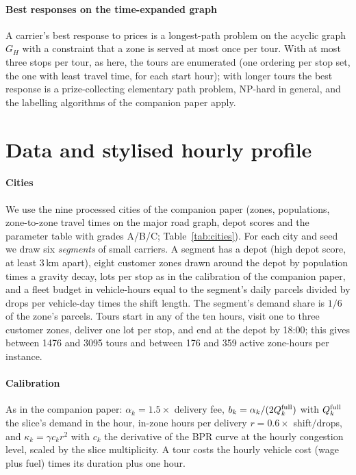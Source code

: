 \documentclass[preprint,11pt,authoryear]{elsarticle}
\theoremstyle{plain}
\theoremstyle{remark}
\begin{document}
\paragraph{Best responses on the time-expanded graph} A carrier's best response to prices is a longest-path problem on the acyclic graph $G_H$ with a constraint that a zone is served at most once per tour. With at most three stops per tour, as here, the tours are enumerated (one ordering per stop set, the one with least travel time, for each start hour); with longer tours the best response is a prize-collecting elementary path problem, NP-hard in general, and the labelling algorithms of the companion paper apply.

\section{Data and stylised hourly profile}\label{sec:data}

\paragraph{Cities} We use the nine processed cities of the companion paper (zones, populations, zone-to-zone travel times on the major road graph, depot scores and the parameter table with grades A/B/C; Table~\ref{tab:cities}). For each city and seed we draw six \emph{segments} of small carriers. A segment has a depot (high depot score, at least 3\,km apart), eight customer zones drawn around the depot by population times a gravity decay, lots per stop as in the calibration of the companion paper, and a fleet budget in vehicle-hours equal to the segment's daily parcels divided by drops per vehicle-day times the shift length. The segment's demand share is $1/6$ of the zone's parcels. Tours start in any of the ten hours, visit one to three customer zones, deliver one lot per stop, and end at the depot by 18:00; this gives between 1476 and 3095 tours and between 176 and 359 active zone-hours per instance.

\paragraph{Calibration} As in the companion paper: $\alpha_k=1.5\times$ delivery fee, $b_k=\alpha_k/(2Q_k^{\rm full})$ with $Q_k^{\rm full}$ the slice's demand in the hour, in-zone hours per delivery $r=0.6\times$ shift$/$drops, and $\kappa_k=\gamma c_kr^2$ with $c_k$ the derivative of the BPR curve at the hourly congestion level, scaled by the slice multiplicity. A tour costs the hourly vehicle cost (wage plus fuel) times its duration plus one hour.
\end{document}
